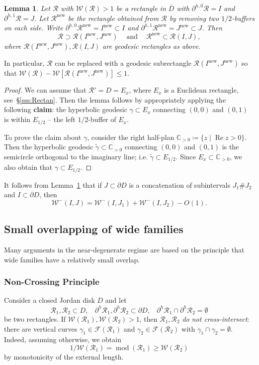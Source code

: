 \documentclass{amsart}
\renewcommand{\sp}{{\ \ }}
\newcommand{\1}{{\mathbb 1 }}
\renewcommand{\Re}{\operatorname {Re}}
\newcommand{\Fam}{{\mathcal F}}
\newcommand{\Width}{{\mathcal W}}
\newcommand\RR{\mathcal{R}}
\newcommand\ovl{\overline}
\newcommand\new{{\operatorname{new}}}
\newcommand{\C}{\mathbb{C}}
\newtheorem{lem}[thm]{Lemma}
\theoremstyle{remark}
\numberwithin{equation}{section}
\theoremstyle{definition}
\renewcommand{\mod}{\operatorname{mod}}
\begin{document}
\begin{lem}
\label{lem:hyp rectangles}
Let $\RR$ with $\Width(\RR)>1$ be a rectangle in $\ovl D$ with $\partial ^{h,0}\RR=I$ and  $\partial ^{h,1}\RR=J$. Let $\RR^\new$ be the rectangle obtained from $\RR$ by removing two $1/2$-buffers on each side. Write $\partial^{h,0}\RR^\new=I^\new\subset I$ and $\partial ^{h,1}\RR^\new=J^\new\subset J$. Then
\[\RR\supset \RR(I^\new,J^\new)\sp\sp\text{ and }\sp\sp \RR^\new\subset \RR(I,J),\]
where $\RR(I^\new,J^\new), \RR(I,J)$ are geodesic rectangles as above.
\end{lem}
\noindent In particular, $\RR$ can be replaced with a geodesic subrectangle $\RR(I^\new,J^\new)$ so that $\Width(\RR)-\Width[\RR(I^\new,J^\new)]\le 1$.
\begin{proof}
We can assume that $\RR'=D=E_x$, where $E_x$ is a Euclidean rectangle, see~\S\ref{sss:Rectan}. Then the lemma follows by appropriately applying the following {\bf claim}: the hyperbolic geodesic $\gamma \subset E_x$ connecting $(0,0)$ and $(0,1)$ is within $E_{1/2}$ -- the left $1/2$-buffer of $E_x$. 

To prove the claim about $\gamma$, consider the right half-plan $\C_{>0}\coloneqq \{z \mid \Re z>0\}$. Then the hyperbolic geodesic $\widetilde \gamma \subset \C_{>0}$ connecting $(0,0)$ and $(0,1)$ is the semicircle orthogonal to the imaginary line; i.e. $\widetilde \gamma\subset E_{1/2}$. Since $E_x\subset \C_{>0}$, we also obtain that $  \gamma\subset E_{1/2}$. 
\end{proof}

It follows from Lemma~\ref{lem:hyp rectangles} that if $J\subset\partial D$ is a concatenation of subintervals $J_1\#J_2$ and $I\subset \partial D$, then
\begin{equation}
\label{eq:width: concat} \Width^-(I,J)=\Width^-(I,J_1)+\Width^-(I,J_2)-O(1).
\end{equation}







\subsection{Small overlapping of wide families} Many arguments in the near-degenerate regime are based on the principle that wide families have a relatively small overlap. 
\subsubsection{Non-Crossing Principle}
\label{sss:non cross princ}  Consider a closed Jordan disk $D$ and let \[\RR_1 , \RR_2\subset  D,\sp\sp \partial^h \RR_1 , \partial^h \RR_2\subset \partial D,\sp\sp \partial^h \RR_1 \cap \partial^{h} \RR_2 =\emptyset\] be two rectangles. If $\Width(\RR_1),\Width(\RR_2)> 1$, then $\RR_1, \RR_2$ \emph{do not cross-intersect}: there are vertical curves $\gamma_1\in \Fam(\RR_1)$ and $\gamma_2\in \Fam(\RR_2)$ with $\gamma_1\cap \gamma_2=\emptyset$. Indeed, assuming otherwise, we obtain
\[1/\Width (\RR_1) = \mod (\RR_1) \ge \Width(\RR_2)\] by monotonicity of the external length.
\end{document}
